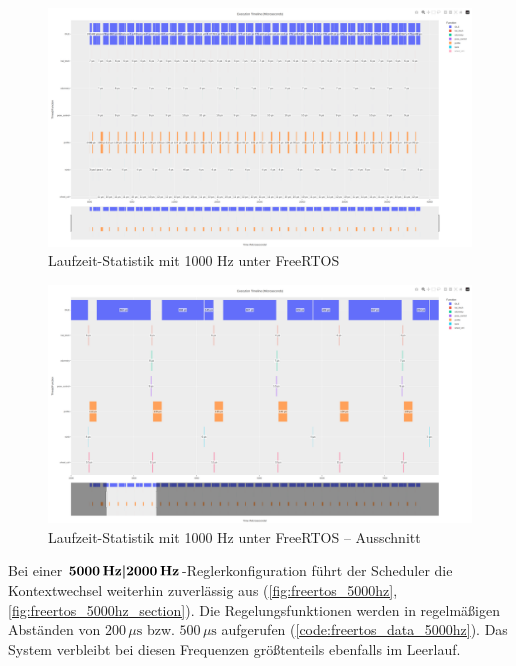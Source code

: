 \begin{figure}[H]
    \centering
    \includegraphics[width=1\textwidth]{assets/freertos_profiling_1000hz}
    \caption{Laufzeit-Statistik mit 1000 Hz unter FreeRTOS}
    \label{fig:freertos_1000hz}
\end{figure}
\begin{figure}[H]
    \centering
    \includegraphics[width=1\textwidth]{assets/freertos_profiling_1000hz_ausschnitt}
    \caption{Laufzeit-Statistik mit 1000 Hz unter FreeRTOS -- Ausschnitt}
    \label{fig:freertos_1000hz_section}
\end{figure}

Bei einer $\textbf{5000\,\text{Hz}\text{|}2000\,\text{Hz}}$-Reglerkonfiguration
führt der Scheduler die Kontextwechsel weiterhin zuverlässig aus
(\ref{fig:freertos_5000hz}, \ref{fig:freertos_5000hz_section}). Die
Regelungsfunktionen werden in regelmäßigen Abständen von $200\,\mu\text{s}$ bzw.
$500\,\mu\text{s}$ aufgerufen (\ref{code:freertos_data_5000hz}). Das System
verbleibt bei diesen Frequenzen größtenteils ebenfalls im Leerlauf.

